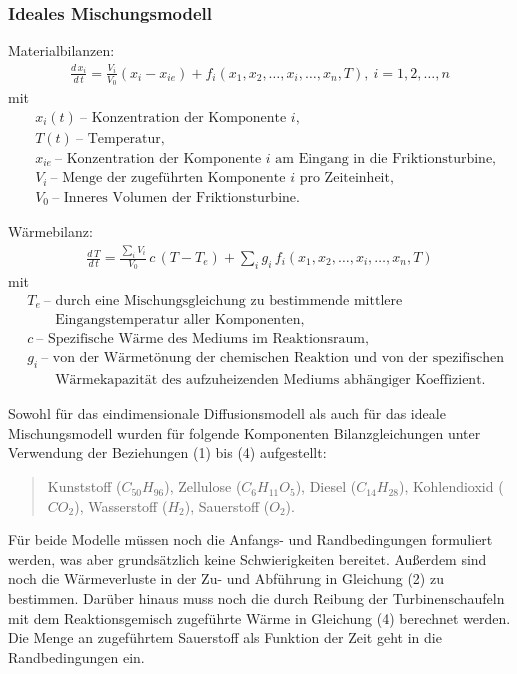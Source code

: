 \documentclass[11pt,a4paper]{article}
\begin{document}
\subsubsection*{Ideales Mischungsmodell}

Materialbilanzen:
\begin{gather*}
  \frac{{d}\,x_i}{{d}\,t} =\frac{V_i}{V_0}(x_i-x_{ie})
  +f_i(x_1,x_2,\ldots,x_i,\ldots,x_n,T),\ i=1,2,\ldots,n \tag{3}
\end{gather*}
mit
\begin{align*}
  & x_i(t)\ \text{-- Konzentration der Komponente $i$,}\\
  & T(t)\ \text{-- Temperatur,}\\
  & x_{ie}\ \text{-- Konzentration der Komponente $i$ am Eingang in die
    Friktionsturbine,}\\
  & V_i\ \text{-- Menge der zugeführten Komponente $i$ pro Zeiteinheit,}\\
  & V_0\ \text{-- Inneres Volumen der Friktionsturbine.}
\end{align*}

Wärmebilanz:
 \begin{gather*}
  \frac{{d}\,T}{{d}\,t} =\frac{\sum_i V_i}{V_0}\,c\,(T-T_{e}) +\sum_i
  g_i\,f_i(x_1,x_2,\ldots,x_i,\ldots,x_n,T) \tag{4}
\end{gather*}
mit
\begin{align*}
  & T_e\ \text{-- durch eine Mischungsgleichung zu bestimmende mittlere}\\
  & \qquad\text{Eingangstemperatur aller Komponenten,}\\
  & c\ \text{-- Spezifische Wärme des Mediums im Reaktionsraum,}\\
  & g_i\ \text{-- von der Wärmetönung der chemischen Reaktion und von der
    spezifischen}\\
  & \qquad\text{Wärmekapazität des aufzuheizenden Mediums abhängiger
    Koeffizient.}
\end{align*}

Sowohl für das eindimensionale Diffusionsmodell als auch für das ideale
Mischungsmodell wurden für folgende Komponenten Bilanzgleichungen unter
Verwendung der Beziehungen (1) bis (4) aufgestellt:
\begin{quote}
  Kunststoff ($C_{50}H_{96}$), Zellulose ($C_6H_{11}O_5$), Diesel
  ($C_{14}H_{28}$), Kohlendioxid ($CO_2$), Wasserstoff ($H_2$), Sauerstoff
  ($O_2$).
\end{quote}
Für beide Modelle müssen noch die Anfangs- und Randbedingungen formuliert
werden, was aber grundsätzlich keine Schwierigkeiten bereitet. Außerdem sind
noch die Wärmeverluste in der Zu- und Abführung in Gleichung (2) zu bestimmen.
Darüber hinaus muss noch die durch Reibung der Turbinenschaufeln mit dem
Reaktionsgemisch zugeführte  Wärme in Gleichung (4) berechnet werden. Die Menge
an zugeführtem Sauerstoff als Funktion der Zeit  geht in die  Randbedingungen
ein.
\end{document}
